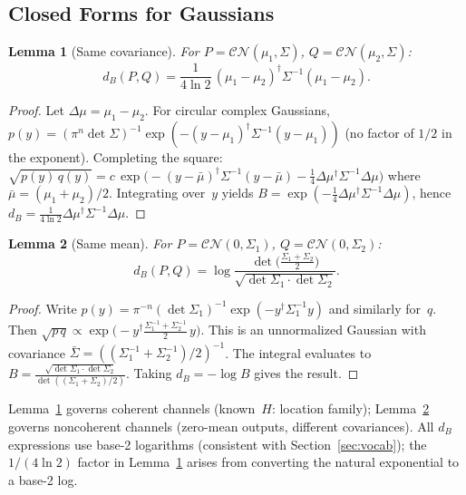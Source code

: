 \documentclass[lettersize,onecolumn]{IEEEtran}
\newtheorem{lemma}{Lemma}
\begin{document}
\subsection{Closed Forms for Gaussians}\label{app:bhatt_gaussian}

\begin{lemma}[Same covariance]\label{lem:bhatt_same_cov}
For $P = \mathcal{CN}(\mu_1,\Sigma)$,
$Q = \mathcal{CN}(\mu_2,\Sigma)$:
\begin{equation}\label{eq:bhatt_same_cov}
d_B(P,Q) = \frac{1}{4\ln 2}\,
(\mu_1-\mu_2)^\dagger\Sigma^{-1}(\mu_1-\mu_2).
\end{equation}
\end{lemma}
\begin{proof}
Let $\Delta\mu = \mu_1 - \mu_2$. For circular complex Gaussians,
$p(y) = (\pi^n\det\Sigma)^{-1}
\exp(-(y-\mu_1)^\dagger\Sigma^{-1}(y-\mu_1))$ (no factor of
$1/2$ in the exponent). Completing the square:
$\sqrt{p(y)\,q(y)} = c\,\exp\!\big(-(y-\bar\mu)^\dagger
\Sigma^{-1}(y-\bar\mu)
- \frac{1}{4}\Delta\mu^\dagger\Sigma^{-1}\Delta\mu\big)$
where $\bar\mu = (\mu_1+\mu_2)/2$.
Integrating over~$y$ yields
$B = \exp(-\frac{1}{4}\Delta\mu^\dagger\Sigma^{-1}\Delta\mu)$,
hence $d_B = \frac{1}{4\ln 2}
\Delta\mu^\dagger\Sigma^{-1}\Delta\mu$.
\end{proof}

\begin{lemma}[Same mean]\label{lem:bhatt_same_mean}
For $P = \mathcal{CN}(0,\Sigma_1)$,
$Q = \mathcal{CN}(0,\Sigma_2)$:
\begin{equation}\label{eq:bhatt_same_mean}
d_B(P,Q) = \log
\frac{\det\!\big(\tfrac{\Sigma_1+\Sigma_2}{2}\big)}
{\sqrt{\det\Sigma_1\cdot\det\Sigma_2}}.
\end{equation}
\end{lemma}
\begin{proof}
Write $p(y) = \pi^{-n}(\det\Sigma_1)^{-1}
\exp(-y^\dagger\Sigma_1^{-1}y)$ and similarly for~$q$.
Then $\sqrt{p\,q} \propto
\exp\!\big(-y^\dagger
\frac{\Sigma_1^{-1}+\Sigma_2^{-1}}{2}\,y\big)$.
This is an unnormalized Gaussian with covariance
$\bar\Sigma = ((\Sigma_1^{-1}+\Sigma_2^{-1})/2)^{-1}$.
The integral evaluates to
$B = \frac{\sqrt{\det\Sigma_1\cdot\det\Sigma_2}}
{\det((\Sigma_1+\Sigma_2)/2)}$.
Taking $d_B = -\log B$ gives the result.
\end{proof}

Lemma~\ref{lem:bhatt_same_cov} governs coherent channels
(known~$H$: location family);
Lemma~\ref{lem:bhatt_same_mean} governs noncoherent channels
(zero-mean outputs, different covariances). All $d_B$ expressions
use base-2 logarithms (consistent with
Section~\ref{sec:vocab}); the $1/(4\ln 2)$ factor in
Lemma~\ref{lem:bhatt_same_cov} arises from converting the
natural exponential to a base-2 log.
\end{document}
